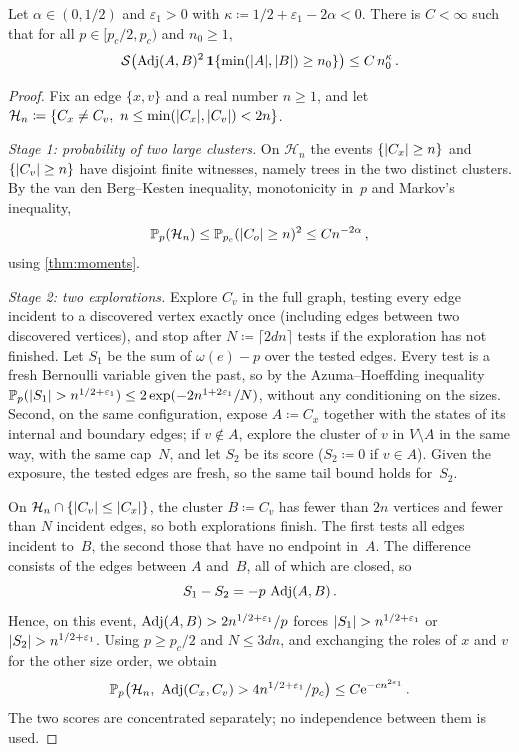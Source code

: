 \begin{lemma}\label{lem:contacts}
Let $\alpha\in(0,1/2)$ and $\varepsilon_1>0$ with $\kappa\coloneqq1/2+\varepsilon_1-2\alpha<0$. There
is $C<\infty$ such that for all $p\in[p_c/2,p_c)$ and $n_0\ge1$,
\begin{equation}\label{eq:contacts}
  \mathcal S\bigl(\operatorname{Adj}(A,B)^2\,\mathbf{1}\{\min(\lvert A\rvert,\lvert B\rvert)\ge n_0\}\bigr)\le C\,n_0^\kappa\,.
\end{equation}
\end{lemma}

\begin{proof}
Fix an edge $\{x,v\}$ and a real number $n\ge1$, and let
$\mathcal H_n\coloneqq\{C_x\neq C_v,\ n\le\min(\abs{C_x},\abs{C_v})<2n\}$.

\emph{Stage 1: probability of two large clusters.} On $\mathcal H_n$ the events $\{\lvert C_x\rvert\ge n\}$ and
$\{\lvert C_v\rvert\ge n\}$ have disjoint finite witnesses, namely trees in the two distinct clusters. By the
van den Berg--Kesten inequality, monotonicity in~$p$ and Markov's inequality,
\begin{equation*}
  \mathbb P_p(\mathcal H_n)\le\mathbb P_{p_c}(\lvert C_o\rvert\ge n)^2\le C n^{-2\alpha}\,,
\end{equation*}
using \cref{thm:moments}.

\emph{Stage 2: two explorations.} Explore $C_v$ in the full graph, testing every edge incident to a
discovered vertex exactly once (including edges between two discovered vertices), and stop after
$N\coloneqq\lceil2dn\rceil$ tests if the exploration has not finished. Let $S_1$ be the sum of
$\omega(e)-p$ over the tested edges. Every test is a fresh Bernoulli variable given the past, so by the
Azuma--Hoeffding inequality $\mathbb P_p(\lvert S_1\rvert>n^{1/2+\varepsilon_1})\le2\exp(-2n^{1+2\varepsilon_1}/N)$,
without any conditioning on the sizes.
Second, on the same configuration, expose $A\coloneqq C_x$ together with the states of its internal and
boundary edges; if $v\notin A$, explore the cluster of $v$ in $V\setminus A$ in the same way, with the
same cap~$N$, and let $S_2$ be its score ($S_2\coloneqq0$ if $v\in A$). Given the exposure, the tested
edges are fresh, so the same tail bound holds for~$S_2$.

On $\mathcal H_n\cap\{\lvert C_v\rvert\le\lvert C_x\rvert\}$, the cluster $B\coloneqq C_v$ has fewer than $2n$
vertices and fewer than $N$ incident edges, so both explorations finish. The first tests all edges
incident to~$B$, the second those that have no endpoint in~$A$. The difference consists of the edges
between $A$ and~$B$, all of which are closed, so
\begin{equation*}
  S_1-S_2=-p\,\operatorname{Adj}(A,B)\,.
\end{equation*}
Hence, on this event, $\operatorname{Adj}(A,B)>2n^{1/2+\varepsilon_1}/p$ forces $\lvert S_1\rvert>n^{1/2+\varepsilon_1}$ or
$\lvert S_2\rvert>n^{1/2+\varepsilon_1}$. Using $p\ge p_c/2$ and $N\le3dn$, and exchanging the roles of $x$ and
$v$ for the other size order, we obtain
\begin{equation*}
  \PP_p\bigl(\mathcal H_n,\ \Adj(C_x,C_v)>4n^{1/2+\varepsilon_1}/p_c\bigr)\le C\e^{-cn^{2\varepsilon_1}}\,.
\end{equation*}
The two scores are concentrated separately; no independence between them is used.


\end{proof}
